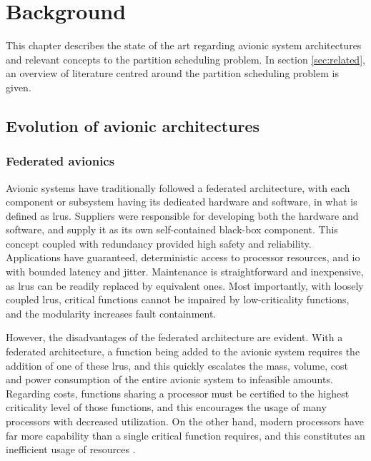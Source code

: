 \documentclass[main.tex]{subfiles}
\begin{document}
\chapter{Background}
\label{sec:background}

This chapter describes the state of the art regarding avionic system architectures and relevant concepts to the partition scheduling problem.
In section \ref{sec:related}, an overview of literature centred around the partition scheduling problem is given.


\section{Evolution of avionic architectures}

\subsection{Federated avionics}

Avionic systems have traditionally followed a federated architecture, with each component or subsystem having its dedicated hardware and software, in what is defined as \glspl{lru}.
Suppliers were responsible for developing both the hardware and software, and supply it as its own self-contained black-box component.
This  concept coupled with redundancy provided high safety and reliability.
Applications have guaranteed, deterministic access to processor resources, and \gls{io} with bounded latency and jitter.
Maintenance is straightforward and inexpensive, as \glspl{lru} can be readily replaced by equivalent ones.
Most importantly, with loosely coupled \glspl{lru}, critical functions cannot be impaired by low-criticality functions, and the modularity increases fault containment.

However, the disadvantages of the federated architecture are evident.
With a federated architecture, a function being added to the avionic system requires the addition of one of these \glspl{lru}, and this quickly escalates the mass, volume, cost and power consumption of the entire avionic system to infeasible amounts.
Regarding costs, functions sharing a processor must be certified to the highest criticality level of those functions, and this encourages the usage of many processors with decreased utilization.
On the other hand, modern processors have far more capability than a single critical function requires, and this constitutes an inefficient usage of resources \cite{mairaj2015preferred}.
\end{document}

